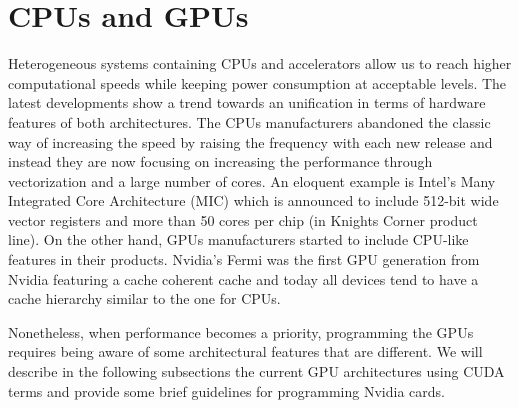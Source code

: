 \section{CPUs and GPUs}
Heterogeneous systems containing CPUs and accelerators allow us to reach higher
computational speeds while keeping power consumption at acceptable levels. The
latest developments show a trend towards an unification in terms of hardware
features of both architectures. The CPUs manufacturers abandoned the classic way
of increasing the speed by raising the frequency with each new release and
instead they are now focusing on increasing the performance through
vectorization and a large number of cores. An eloquent example is Intel's Many
Integrated Core Architecture (MIC) \cite{intel_mic} which is announced to
include 512-bit wide vector registers and more than 50 cores per chip (in
Knights Corner product line). On the other hand, GPUs manufacturers started to
include CPU-like features in their products. Nvidia's Fermi \cite{fermi} was
the first GPU generation from Nvidia featuring a cache coherent cache and today
all devices tend to have a cache hierarchy similar to the one for CPUs.

Nonetheless, when performance becomes a priority, programming the GPUs requires
being aware of some architectural features that are different. We will describe
in the following subsections the current GPU architectures using CUDA terms and
provide some brief guidelines for programming Nvidia cards.


